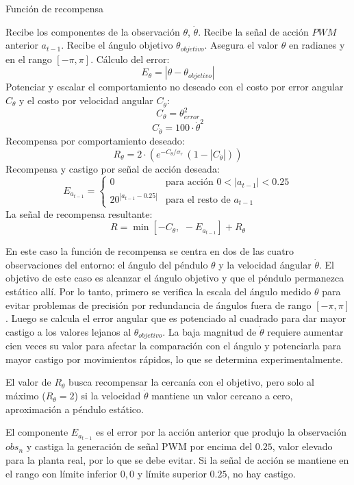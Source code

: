 \begin{algorithm}[hh]
\caption{Función de recompensa}\label{alg:reward}
\begin{algorithmic}[1]
\State Recibe los componentes de la observación $\theta$, $\dot{\theta}$.
\State Recibe la señal de acción $PWM$ anterior $a_{t-1}$.
\State Recibe el ángulo objetivo $\theta_{objetivo}$.
\State Asegura el valor $\theta$ en radianes y en el rango $[-\pi,\pi]$.
\State Cálculo del error: 
\[E_{\theta} = |\theta - \theta_{objetivo}|\]
\State Potenciar y escalar el comportamiento no deseado con el costo por error angular $C_\theta$ y el costo por velocidad angular $C_{\dot{\theta}}$:
\[C_{\theta} = \theta^2_{error}\]
\[C_{\dot{\theta}} = 100 \cdot \dot{\theta}^2\]
\State Recompensa por comportamiento deseado:
\[R_{\theta} = 2 \cdot \left( e^{-C_{\theta}/\sigma_r} \, (1 - |C_{\dot{\theta}}|)\right)\]
\State Recompensa y castigo por señal de acción deseada:
\[E_{a_{t-1}} = \left\{ \begin{array}{ll}
0 & \mbox{para acción $0<|a_{t-1}|<0.25$} \\
20^{|a_{t-1} - 0.25|} & \mbox{para el resto de $a_{t-1}$}
\end{array}
\right.\]
\State La señal de recompensa resultante:
\[R = \min \left[-C_{\theta}, \,\, -E_{a_{t-1}}\right] + R_{\theta}\]
\end{algorithmic}
\end{algorithm}

En este caso la función de recompensa se centra en dos de las cuatro observaciones del entorno: el ángulo del péndulo $\theta$ y la velocidad ángular $\dot{\theta}$. El objetivo de este caso es alcanzar el ángulo objetivo y que el péndulo permanezca estático allí. Por lo tanto, primero se verifica la escala del ángulo medido $\theta$ para evitar problemas de precisión por redundancia de ángulos fuera de rango $[-\pi, \pi]$. Luego se calcula el error angular que es potenciado al cuadrado para dar mayor castigo a los valores lejanos al $\theta_{objetivo}$. La baja magnitud de $\dot{\theta}$ requiere aumentar cien veces su valor para afectar la comparación con el ángulo y potenciarla para mayor castigo por movimientos rápidos, lo que se determina experimentalmente.

El valor de $R_{\theta}$ busca recompensar la cercanía con el objetivo, pero solo al máximo ($R_{\theta}=2$) si la velocidad $\dot{\theta}$ mantiene un valor cercano a cero, aproximación a péndulo estático. 

El componente $E_{a_{t-1}}$ es el error por la acción anterior que produjo la observación $obs_n$ y castiga la generación de señal PWM por encima del $0.25$, valor elevado para la planta real, por lo que se debe evitar. Si la señal de acción se mantiene en el rango con límite inferior $0,0$ y límite superior $0.25$, no hay castigo.

